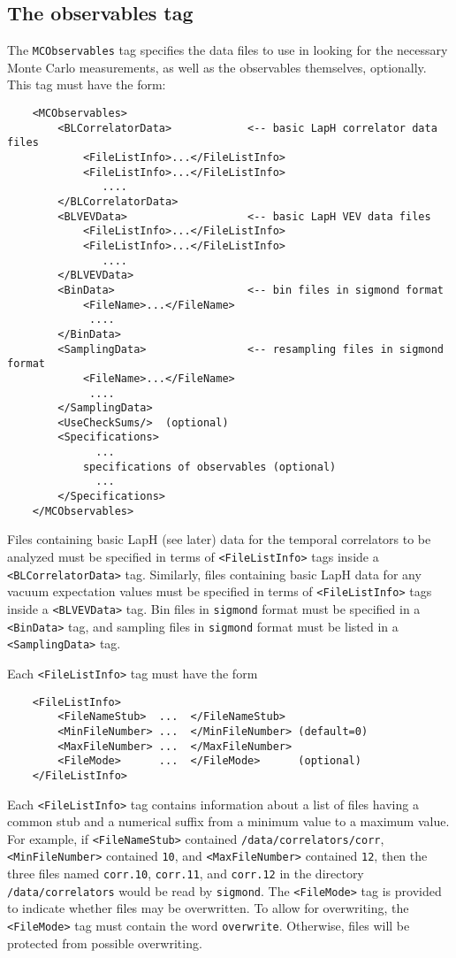 \documentclass[12pt]{article}
\newcommand{\vb}{\texttt}
\begin{document}
\subsection{The observables tag}
The \vb{MCObservables} tag specifies the data files to use in looking
for the necessary Monte Carlo measurements, as well as the observables
themselves, optionally.  This tag must have the form:
\begin{verbatim}
    <MCObservables>
        <BLCorrelatorData>            <-- basic LapH correlator data files
            <FileListInfo>...</FileListInfo>
            <FileListInfo>...</FileListInfo> 
               .... 
        </BLCorrelatorData>
        <BLVEVData>                   <-- basic LapH VEV data files
            <FileListInfo>...</FileListInfo>
            <FileListInfo>...</FileListInfo> 
               ....
        </BLVEVData>
        <BinData>                     <-- bin files in sigmond format
            <FileName>...</FileName>
             .... 
        </BinData>
        <SamplingData>                <-- resampling files in sigmond format
            <FileName>...</FileName>
             .... 
        </SamplingData>
        <UseCheckSums/>  (optional)
        <Specifications>
              ... 
            specifications of observables (optional)
              ...   
        </Specifications>
    </MCObservables>
\end{verbatim}

Files containing basic LapH (see later) data for the temporal correlators to be analyzed
must be specified in terms of \vb{<FileListInfo>} tags inside a
\vb{<BLCorrelatorData>} tag.  Similarly, files containing basic LapH data for
any vacuum expectation values must be specified in terms
of \vb{<FileListInfo>} tags inside a \vb{<BLVEVData>} tag.  Bin files
in \vb{sigmond} format must be specified in a \vb{<BinData>} tag, and sampling files
in \vb{sigmond} format must be listed in a \vb{<SamplingData>} tag.

Each \vb{<FileListInfo>} tag must have the form
\begin{verbatim}
    <FileListInfo>
        <FileNameStub>  ...  </FileNameStub>
        <MinFileNumber> ...  </MinFileNumber> (default=0)
        <MaxFileNumber> ...  </MaxFileNumber>
        <FileMode>      ...  </FileMode>      (optional)
    </FileListInfo>
\end{verbatim}
Each \vb{<FileListInfo>} tag contains information about a list of files
having a common stub and a numerical suffix from a minimum value to a 
maximum value. For example, if \vb{<FileNameStub>} contained
\vb{/data/correlators/corr}, \vb{<MinFileNumber>} contained
\vb{10}, and \vb{<MaxFileNumber>} contained \vb{12}, then
the three files named \vb{corr.10}, \vb{corr.11}, and \vb{corr.12}
in the directory \vb{/data/correlators} would be read by \vb{sigmond}.
The \vb{<FileMode>} tag is provided to indicate whether
files may be overwritten. To allow for overwriting, the
\vb{<FileMode>} tag must contain the word \vb{overwrite}. Otherwise,
files will be protected from possible overwriting.
\end{document}
